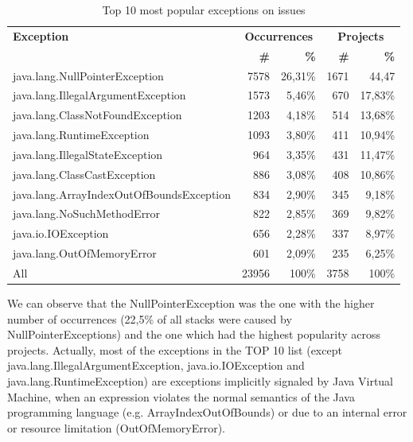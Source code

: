 \documentclass[conference]{IEEEtran}
\begin{document}
\begin{table}
\begin{tabular}{lrrrr}
    \hline
    \bfseries{Exception} &  \multicolumn{2}{c}{\bfseries{Occurrences}} &  \multicolumn{2}{c}{\bfseries{Projects}}\\
    & \bfseries{\#} &  \bfseries{\%} & \bfseries{\# } & \bfseries{\% } \\
    \hline
java.lang.NullPointerException	& 7578	& 26,31\%	& 1671	& 44,47 \\
java.lang.IllegalArgumentException &	1573 &	5,46\% &	670	& 17,83\% \\
java.lang.ClassNotFoundException &	1203 &	4,18\%	& 514 & 13,68\% \\
java.lang.RuntimeException &	1093	& 3,80\% &	411	& 10,94\% \\
java.lang.IllegalStateException	& 964 &	3,35\%	&  431 &	11,47\% \\
java.lang.ClassCastException &	886	& 3,08\% & 408 & 10,86\% \\ 
java.lang.ArrayIndexOutOfBoundsException &	834	& 2,90\% & 345 & 9,18\% \\
java.lang.NoSuchMethodError	& 822 &	2,85\% & 369 & 9,82\% \\
java.io.IOException &	656 &	2,28\%	& 337 &	8,97\% \\
java.lang.OutOfMemoryError	& 601 &	2,09\% & 235 & 6,25\% \\
\hline
All	 &	23956 &	100\%	& 3758 & 100\%	 \\
\hline
  \end{tabular}
\caption{Top 10 most popular exceptions on issues}
\label{tab:toptenjava}
\end{table}

We can observe that the NullPointerException was the one with the higher number of occurrences (22,5\% of all stacks were caused by NullPointerExceptions) and the one which had the highest popularity across projects. Actually, most of the exceptions in the TOP 10 list (except java.lang.IllegalArgumentException, java.io.IOException and java.lang.RuntimeException) are exceptions implicitly signaled by Java Virtual Machine, when an expression violates the normal semantics of the Java programming language (e.g. ArrayIndexOutOfBounds) or due to an internal error or resource limitation (OutOfMemoryError). 
\end{document}
